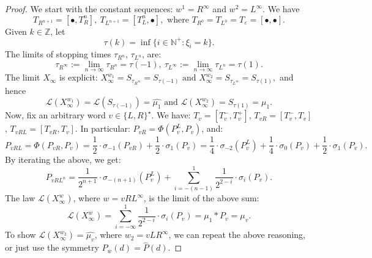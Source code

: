 \documentclass[10pt,a4paper]{amsart}
\newcommand{\LL}{\mathcal{L}}
\newcommand{\N}{\mathbb{N}}
\newcommand{\Z}{\mathbb{Z}}
\newcommand{\eps}{\varepsilon}
\begin{document}
\begin{proof}
 We start with the constant sequences:  $w^1=R^{\infty}$ and $w^2=L^{\infty}$. We have 
$$T_{R^{n+1}}=[\bullet, T_R^n],\ T_{L^{n+1}}=[ T_L^n,\bullet],\mbox{ where }T_{R^0}=T_{L^0}=T_{\eps}=[\bullet,\bullet]. $$
Given $k\in\Z$, let 
$$\tau(k)=\inf\{i\in\N^+\colon \xi_i=k\}.$$ The limits of stopping times $\tau_{R^n}$, $\tau_{L^n}$, are:
$$\tau_{R^{\infty}}:=\lim\limits_{n\to\infty}\tau_{R^n}=\tau(-1),\ \tau_{L^{\infty}}:=\lim\limits_{n\to\infty}\tau_{L^n}=\tau(1).$$
 The limit $X_\infty$ is explicit: $ X_\infty^{w_1}=S_{\tau_{R^{\infty}}}=S_{\tau(-1)}\mbox{ and }X_\infty^{w_2}=S_{\tau_{L^{\infty}}}=S_{\tau(1)},$
and hence
$$\LL( X_{\infty}^{w_1})=\LL(S_{\tau(-1)})=\hat{\mu_1}\mbox{ and }\LL( X_{\infty}^{w_2})=S_{\tau(1)}=\mu_1.$$
Now, fix an arbitrary word $v\in\{L,R\}^{\star}$. We have: $T_v=[T_v^-,T_v^+]$,  $T_{vR}=[T_v^-,T_v]$, $T_{vRL}=[ T_{vR} ,T_v]$. In particular: $P_{vR}=\Phi(P_v^L,P_v)$, and:
$$P_{vRL}=\Phi(P_{vR},P_v)=\frac12\cdot \sigma_{-1}(P_{vR}) + \frac12\cdot \sigma_{1}(P_v)=\frac14\cdot \sigma_{-2}(P_v^L) + \frac14\cdot \sigma_{0}(P_{v}) + \frac12\cdot \sigma_{1}(P_{v}).$$
By iterating the above, we get:
\begin{equation}\label{iterating}
P_{vRL^n}=\frac{1}{2^{n+1}}\cdot \sigma_{-(n+1)}(P_v^L) + \sum\limits_ {i=-(n-1)}^1  \frac{1}{2^{2-i}}\cdot \sigma_{i}(P_v).
\end{equation}
  The  law  $\LL(X^w_{\infty})$, where $w=vRL^{\infty}$,  is the limit of the above sum:
$$\LL(X^w_{\infty})=\sum\limits_{i=-\infty}^{1} \frac{1}{2^{2-i}}\cdot \sigma_{i}(P_v)=\mu_1 * P_{v}=\mu_{v}.$$
To show $\LL(X_{\infty}^{w_2})=\hat{\mu_{v}}$, where $w_2=vLR^{\infty}$, we can repeat the above reasoning, or just use the symmetry $P_{\overline{w}}(d)=\hat{P}(d)$.
\end{proof}
\end{document}
